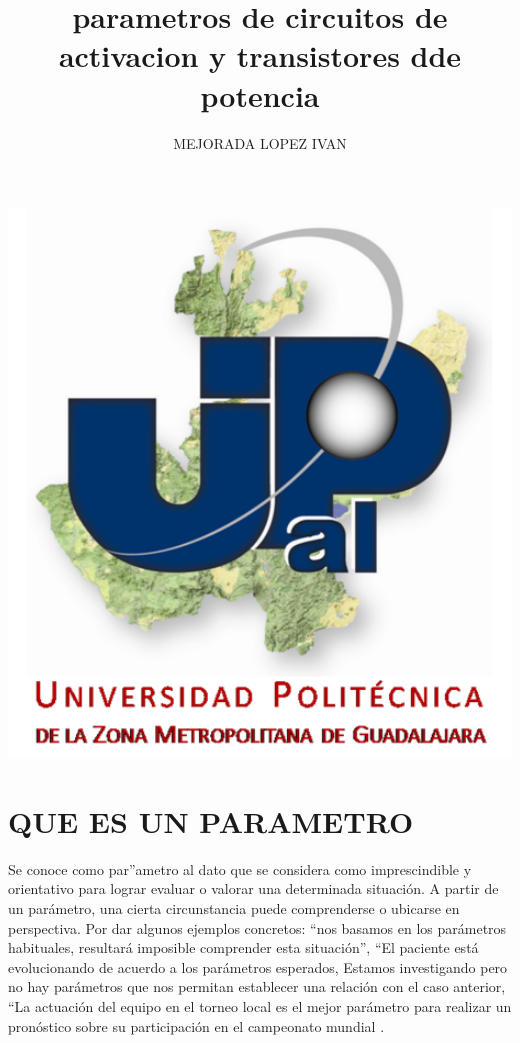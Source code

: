 \documentclass[12pt,a4paper]{article}
\author{MEJORADA LOPEZ IVAN}
\title{parametros de circuitos de activacion y transistores dde potencia }
\begin{document}
\maketitle
\includegraphics[width=16cm]{UPZMG_Prueba_1b.png}  
\newpage
\section{QUE ES UN PARAMETRO}
Se conoce como par''ametro al dato que se considera como imprescindible y orientativo para lograr evaluar o valorar una determinada situaci\'on. A partir de un par\'ametro, una cierta circunstancia puede comprenderse o ubicarse en perspectiva. Por dar algunos ejemplos concretos: “\Si nos basamos en los par\'ametros habituales, resultar\'a imposible comprender esta situaci\'on”, “El paciente est\'a evolucionando de acuerdo a los par\'ametros esperados\”, \“ Estamos investigando pero no hay par\'ametros que nos permitan establecer una relaci\'on con el caso anterior\”, “La actuaci\'on del equipo en el torneo local es el mejor par\'ametro para realizar un pron\'ostico sobre su participaci\'on en el campeonato mundial \”.
\end{document}

